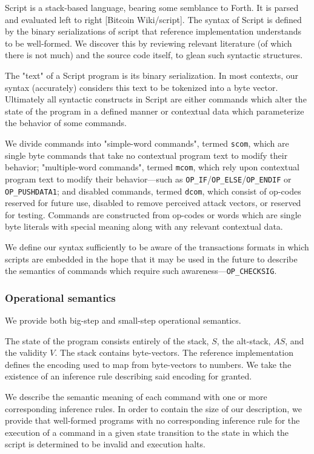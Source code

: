 \documentclass[letterpaper, 10 pt, conference]{ieeeconf}
\begin{document}
Script is a stack-based language, bearing some semblance to Forth. It is parsed and evaluated left to right [Bitcoin Wiki/script]. The syntax of Script is defined by the binary serializations of script that reference implementation understands to be well-formed. We discover this by reviewing relevant literature (of which there is not much) and the source code itself, to glean such syntactic structures.

The "text" of a Script program is its binary serialization. In most contexts, our syntax (accurately) considers this text to be tokenized into a byte vector. Ultimately all syntactic constructs in Script are either commands which alter the state of the program in a defined manner or contextual data which parameterize the behavior of some commands.

We divide commands into "simple-word commands", termed \texttt{scom}, which are single byte commands that take no contextual program text to modify their behavior; "multiple-word commands", termed \texttt{mcom}, which rely upon contextual program text to modify their behavior---such as \texttt{OP\_IF}/\texttt{OP\_ELSE}/\texttt{OP\_ENDIF} or \texttt{OP\_PUSHDATA1}; and disabled commands, termed \texttt{dcom}, which consist of op-codes reserved for future use, disabled to remove perceived attack vectors, or reserved for testing. Commands are constructed from op-codes or words which are single byte literals with special meaning along with any relevant contextual data.

We define our syntax sufficiently to be aware of the transactions formats in which scripts are embedded in the hope that it may be used in the future to describe the semantics of commands which require such awareness---\texttt{OP\_CHECKSIG}.

\subsubsection{Operational semantics}

We provide both big-step and small-step operational semantics.

The state of the program consists entirely of the stack, $S$, the alt-stack, $AS$, and the validity $V$. The stack contains byte-vectors. The reference implementation defines the encoding used to map from byte-vectors to numbers. We take the existence of an inference rule describing said encoding for granted.

We describe the semantic meaning of each command with one or more corresponding inference rules. In order to contain the size of our description, we provide that well-formed programs with no corresponding inference rule for the execution of a command in a given state transition to the state in which the script is determined to be invalid and execution halts.
\end{document}
